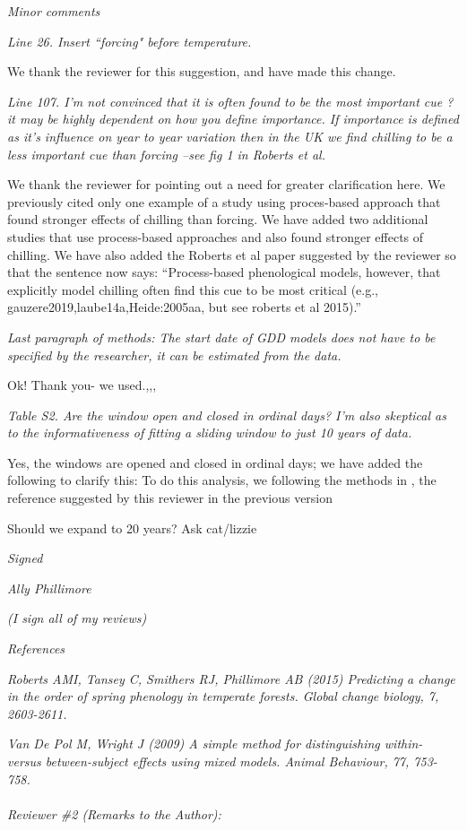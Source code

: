 \documentclass[11pt, a4paper]{article}
\begin{document}
\par \emph{Minor comments}
\par \emph{Line 26. Insert ``forcing" before temperature.}
\par We thank the reviewer for this suggestion, and have made this change.
\par \emph{Line 107. I'm not convinced that it is often found to be the most important cue ? it may be highly
dependent on how you define importance. If importance is defined as it's influence on year to year
variation then in the UK we find chilling to be a less important cue than forcing --see fig 1 in Roberts et
al.}
\par We thank the reviewer for pointing out a need for greater clarification here. We previously cited only one example of a study using proces-based approach that found stronger effects of chilling than forcing. We have added two additional studies that use process-based approaches and also found stronger effects of chilling. We have also added the Roberts et al paper suggested by the reviewer so that the sentence now says:
``Process-based phenological models, however, that explicitly model chilling often find this cue to be most critical (e.g., gauzere2019,laube14a,Heide:2005aa, but see roberts et al 2015).''

\par \emph{Last paragraph of methods: The start date of GDD models does not have to be specified by the
researcher, it can be estimated from the data.}
\par Ok! Thank you- we used.,,,
\par \emph{Table S2. Are the window open and closed in ordinal days? I'm also skeptical as to the informativeness
of fitting a sliding window to just 10 years of data.}
\par Yes, the windows are opened and closed in ordinal days; we have added the following to clarify this:
To do this analysis, we following the methods in , the reference suggested by this reviewer in the previous version 

\par Should we expand to 20 years? Ask cat/lizzie

\par \emph{Signed}
\par \emph{Ally Phillimore}
\par \emph{(I sign all of my reviews)}
\par \emph{References}
\par \emph{Roberts AMI, Tansey C, Smithers RJ, Phillimore AB (2015) Predicting a change in the order of spring
phenology in temperate forests. Global change biology, 7, 2603-2611.}
\par \emph{Van De Pol M, Wright J (2009) A simple method for distinguishing within- versus between-subject effects
using mixed models. Animal Behaviour, 77, 753-758.}
\\
\\
 \emph{Reviewer \#2 (Remarks to the Author):}\\
\end{document}
